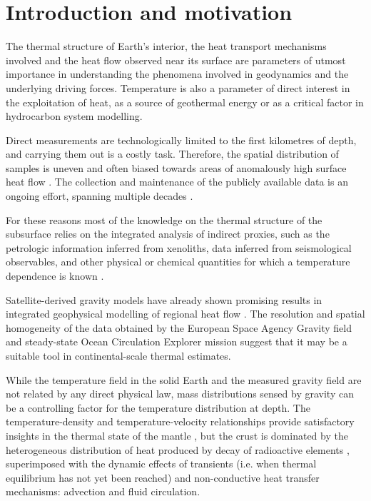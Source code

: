 \chapter{Introduction and motivation}
\label{c:Intro}

The thermal structure of Earth's interior, the heat transport mechanisms involved and the heat flow observed near its surface are parameters of utmost importance in understanding the phenomena involved in geodynamics and the underlying driving forces.
Temperature is also a parameter of direct interest in the exploitation of heat, as a source of geothermal energy or as a critical factor in hydrocarbon system modelling.

Direct measurements are technologically limited to the first kilometres of depth, and carrying them out is a costly task.
Therefore, the spatial distribution of samples is uneven and often biased towards areas of anomalously high surface heat flow \parencite{Mareschal2013}.
The collection and maintenance of the publicly available data is an ongoing effort, spanning multiple decades \parencite{Lee1965}.

For these reasons most of the knowledge on the thermal structure of the subsurface relies on the integrated analysis of indirect proxies, such as the petrologic information inferred from xenoliths, data inferred from seismological observables, and other physical or chemical quantities for which a temperature dependence is known \parencites{fischer2010lab}{Vila2010}{Afonso2013multiobsI}.

Satellite-derived gravity models have already shown promising results in integrated geophysical modelling of regional heat flow \parencite{Bouman2015}.
The resolution and spatial homogeneity of the data obtained by the European Space Agency Gravity field and steady-state Ocean Circulation Explorer mission \parencites[GOCE, ][]{Floberghagen2011_goce}{vanderMeijde2015} suggest that it may be a suitable tool in continental-scale thermal estimates.

While the temperature field in the solid Earth and the measured gravity field are not related by any direct physical law, mass distributions sensed by gravity can be a controlling factor for the temperature distribution at depth.
The temperature-density and temperature-velocity relationships provide satisfactory insights in the thermal state of the mantle \parencites{Priestley2006}{Cammarano2011}, but the crust is dominated by the heterogeneous distribution of heat produced by decay of radioactive elements \parencite{Jaupart2016}, superimposed with the dynamic effects of transients (i.e. when thermal equilibrium has not yet been reached) and non-conductive heat transfer mechanisms: advection and fluid circulation.

